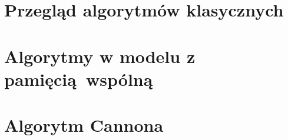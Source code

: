 \section{Przegląd algorytmów klasycznych}


\section{Algorytmy w modelu z pamięcią wspólną}


\section{Algorytm Cannona}


